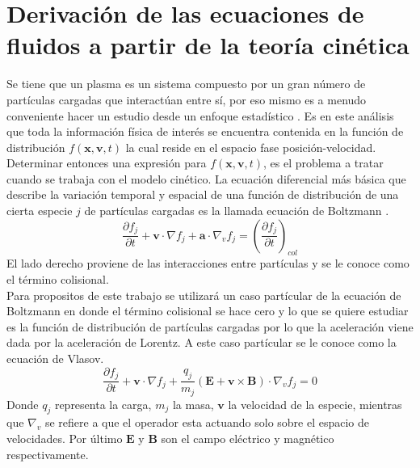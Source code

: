 \documentclass[../tesis_main_file.tex]{subfiles}
\begin{document}
\section{Derivación de las ecuaciones de fluidos a partir de la teoría cinética}
Se tiene que un plasma es un sistema compuesto por un gran número de partículas cargadas que interactúan entre sí, por eso mismo es a menudo conveniente hacer un estudio desde un enfoque estadístico \cite{bittencourt2013fundamentals}.
Es en este análisis que toda la información física de interés se encuentra contenida en la función de distribución $f(\textbf{x},\textbf{v},t)$ la cual reside en el espacio fase posición-velocidad.\\
Determinar entonces una expresión para $f(\textbf{x},\textbf{v},t)$, es el problema a tratar cuando se trabaja con el modelo cinético. La ecuación diferencial más básica que describe la variación temporal y espacial de una función de distribución de una cierta especie $j$ de partículas cargadas es la llamada ecuación de Boltzmann \cite{jardin2010computational}.
\begin{equation}
\label{eq:boltzmann-intro}
\frac{\partial f_j}{\partial t}+ \textbf{v}\cdot \nabla f_j + \textbf{a}\cdot \nabla _v f_j=\left(\frac{\partial f_j}{\partial t}\right)_{col}
\end{equation}
El lado derecho proviene de las interacciones entre partículas y se le conoce como el término colisional.\\
Para propositos de este trabajo se utilizará un caso partícular de la ecuación de Boltzmann en donde el término colisional se hace cero y lo que se quiere estudiar es la función de distribución de partículas cargadas por lo que la aceleración viene dada por la aceleración de Lorentz. A este caso partícular se le conoce como la ecuación de Vlasov.
\begin{equation}
\label{eq:boltzmann-vlasov-intro}
\frac{\partial f_j}{\partial t}+ \textbf{v}\cdot \nabla f_j + \frac{q_j}{m_j}\left( \textbf{E} + \textbf{v} \times \textbf{B}\right)\cdot \nabla _v f_j=0
\end{equation}
Donde $q_j$ representa la carga, $m_j$ la masa, $\textbf{v}$ la velocidad de la especie, mientras que $\nabla _v$ se refiere a que el operador esta actuando solo sobre el espacio de velocidades. Por último $\textbf{E}$ y $\textbf{B}$ son el campo eléctrico y magnético respectivamente.\\
\end{document}
